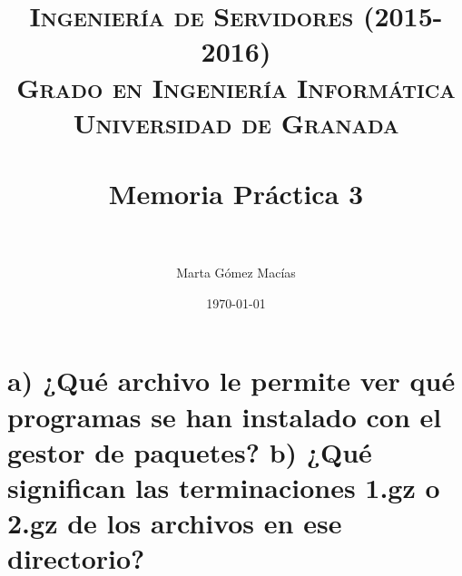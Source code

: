 \documentclass[10pt,a4paper,spanish]{article}
\title{
\normalfont \normalsize 
\textsc{{\bf Ingeniería de Servidores (2015-2016)} \\ Grado en Ingeniería Informática \\ Universidad de Granada} \\ [25pt] %
\horrule{0.5pt} \\[0.4cm] %
\huge Memoria Práctica 3 \\ %
\horrule{2pt} \\[0.5cm] %
}
\author{Marta Gómez Macías} %
\date{\normalsize\today} %
\numberwithin{equation}{section} %
\numberwithin{figure}{section} %
\numberwithin{table}{section} %
\begin{document}
\renewcommand{\listtablename}{Índice de tablas}

\maketitle %

\newpage %

\tableofcontents %

\listoffigures


\newpage

\section{a) ¿Qué archivo le permite ver qué programas se han instalado con el gestor de paquetes? b) ¿Qué significan las terminaciones 1.gz o 2.gz de los archivos en ese directorio?}
\end{document}
